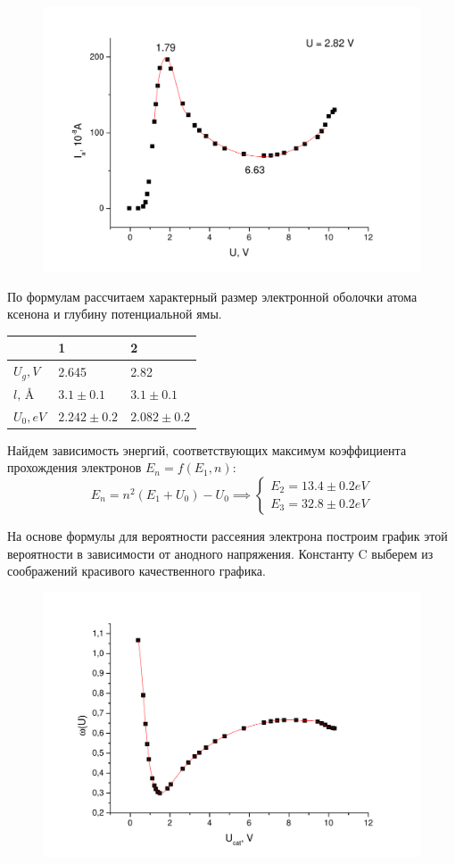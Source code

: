 \documentclass[a4paper,12pt]{article}
\begin{document}
		\begin{figure}[h!]
			\centering
			\includegraphics[width=0.7\linewidth]{graph2}
		\end{figure}
		
		По формулам рассчитаем характерный размер электронной оболочки атома ксенона и глубину потенциальной ямы.
		
		\begin{table}[h!]
			\centering
			\label{my-label}
			\begin{tabular}{|l|l|l|} \hline
				& 1     & 2     \\ \hline
				$U_g, V$   & 2.645 & 2.82  \\ \hline
				$l, \,$\AA & $3.1\pm0.1$  & $3.1\pm0.1$  \\ \hline
				$U_0, eV$  & $2.242\pm0.2$ & $2.082\pm0.2$ \\ \hline
			\end{tabular}
		\end{table}
		
		Найдем зависимость энергий, соответствующих максимум коэффициента прохождения электронов $E_n = f(E_1, n)$:
		$$
			E_n = n^2\left(E_1+U_0\right)-U_0 \implies \begin{cases}
			E_2 = 13.4\pm0.2 eV \\
			E_3 = 32.8\pm0.2 eV
			\end{cases}
		$$ 
		
		На основе формулы для вероятности рассеяния электрона построим график этой вероятности в зависимости от анодного напряжения. Константу C выберем из соображений красивого качественного графика.
		
		\begin{figure}[h!]
			\centering
			\includegraphics[width=0.7\linewidth]{omega}
		\end{figure}
		
\end{document}
